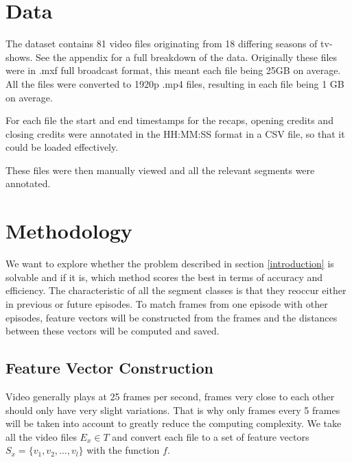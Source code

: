 \documentclass{article}
\begin{document}
\cite{gauch2006finding} %
\cite{wang2008multimodal} %

\cite{herley2006argos} %
\cite{berrani2008non} %

\cite{benezeth2010unsupervised} %
\cite{ibrahim2011tv} %
\cite{abduraman2011unsupervised} %
\fi


\section{Data} \label{data}

The dataset contains 81 video files originating from 18 differing seasons of tv-shows. See the appendix for a full breakdown of the data. Originally these files were in .mxf full broadcast format, this meant each file being 25GB on average. All the files were converted to 1920p .mp4 files, resulting in each file being 1 GB on average.

For each file the start and end timestamps for the recaps, opening credits and closing credits were annotated in the HH:MM:SS format in a CSV file, so that it could be loaded effectively.

These files were then manually viewed and all the relevant segments were annotated. 

\section{Methodology} \label{methodology}
We want to explore whether the problem described in section \ref{introduction} is solvable and if it is, which method scores the best in terms of accuracy and efficiency. The characteristic of all the segment classes is that they reoccur either in previous or future episodes. To match frames from one episode with other episodes, feature vectors will be constructed from the frames and the distances between these vectors will be computed and saved. 

\subsection{Feature Vector Construction}
Video generally plays at 25 frames per second, frames very close to each other should only have very slight variations. That is why only frames every 5 frames will be taken into account to greatly reduce the computing complexity. We take all the video files $E_x \in T$ and convert each file to a set of feature vectors $S_x = \{v_1, v_2, \dots, v_l\}$ with the function $f$.
\end{document}
